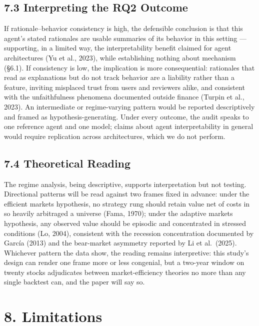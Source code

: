 \documentclass[
  12pt,
]{article}
\begin{document}
\hypertarget{interpreting-the-rq2-outcome}{%
\subsection{7.3 Interpreting the RQ2
Outcome}\label{interpreting-the-rq2-outcome}}

If rationale--behavior consistency is high, the defensible conclusion is
that this agent's stated rationales are usable summaries of its behavior
in this setting --- supporting, in a limited way, the interpretability
benefit claimed for agent architectures (Yu et al., 2023), while
establishing nothing about mechanism (§6.1). If consistency is low, the
implication is more consequential: rationales that read as explanations
but do not track behavior are a liability rather than a feature,
inviting misplaced trust from users and reviewers alike, and consistent
with the unfaithfulness phenomena documented outside finance (Turpin et
al., 2023). An intermediate or regime-varying pattern would be reported
descriptively and framed as hypothesis-generating. Under every outcome,
the audit speaks to one reference agent and one model; claims about
agent interpretability in general would require replication across
architectures, which we do not perform.

\hypertarget{theoretical-reading}{%
\subsection{7.4 Theoretical Reading}\label{theoretical-reading}}

The regime analysis, being descriptive, supports interpretation but not
testing. Directional patterns will be read against two frames fixed in
advance: under the efficient markets hypothesis, no strategy rung should
retain value net of costs in so heavily arbitraged a universe (Fama,
1970); under the adaptive markets hypothesis, any observed value should
be episodic and concentrated in stressed conditions (Lo, 2004),
consistent with the recession concentration documented by García (2013)
and the bear-market asymmetry reported by Li et al.~(2025). Whichever
pattern the data show, the reading remains interpretive: this study's
design can render one frame more or less congenial, but a two-year
window on twenty stocks adjudicates between market-efficiency theories
no more than any single backtest can, and the paper will say so.

\hypertarget{limitations}{%
\section{8. Limitations}\label{limitations}}
\end{document}

